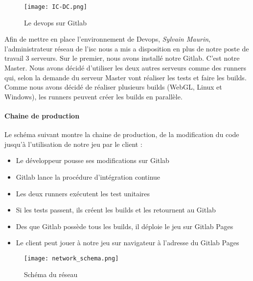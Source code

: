 \begin{figure}[H]
    \begin{center}
    \texttt{[image: IC-DC.png]}
    \end{center}
    \caption{Le devops sur Gitlab}
\label{DevopsGitlab}
\end{figure}


Afin de mettre en place l'environnement de Devops, \emph{Sylvain Maurin}, l'administrateur réseau de l'\gls{isc} nous a mis a disposition en plus de notre poste de travail 3 serveurs.
Sur le premier, nous avons installé notre Gitlab. C'est notre Master. Nous avons décidé d'utiliser les deux autres serveurs comme des runners qui, selon la demande du serveur Master
vont réaliser les tests et faire les builds. Comme nous avons décidé de réaliser plusieurs builds (WebGL, Linux et Windows), les runners peuvent
créer les builds en parallèle.

\newpage
\paragraph{Chaine de production}Le schéma suivant montre la chaine de production, de la modification du code jusqu'à l'utilisation de notre jeu par le client :
\begin{itemize}
\item Le développeur pousse ses modifications sur Gitlab
\item Gitlab lance la procédure d'intégration continue
\item Les deux runners exécutent les test unitaires
\item Si les tests passent, ils créent les builds et les retournent au Gitlab
\item Des que Gitlab possède tous les builds, il déploie le jeu sur Gitlab Pages
\item Le client peut jouer à notre jeu sur navigateur à l'adresse du Gitlab Pages
\end{itemize}


\begin{figure}[H]
    \begin{center}
    \texttt{[image: network\_schema.png]}
    \end{center}
    \caption{Schéma du réseau}
\label{NetworkSchema}
\end{figure}